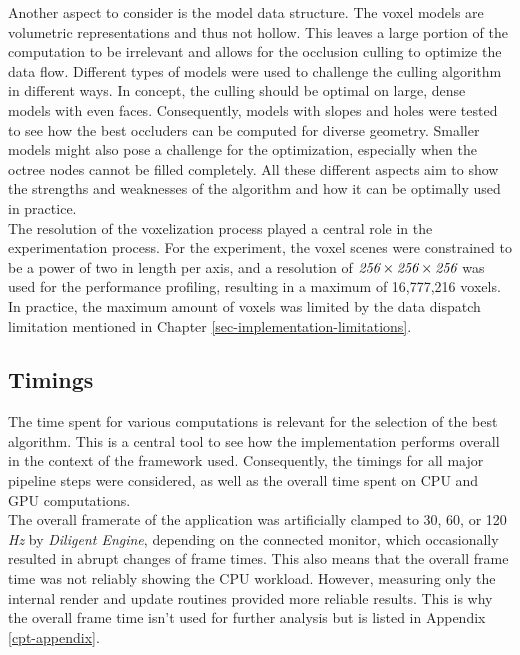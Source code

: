 Another aspect to consider is the model data structure. The voxel models are volumetric representations and thus 
not hollow. This leaves a large portion of the computation to be irrelevant and allows for the occlusion culling to 
optimize the data flow. Different types of models were used to challenge the culling algorithm in different ways. 
In concept, the culling should be optimal on large, dense models with even faces. Consequently, models with 
slopes and holes were tested to see how the best occluders can be computed for diverse geometry. Smaller models might 
also pose a challenge for the optimization, especially when the octree nodes cannot be filled completely. All these 
different aspects aim to show the strengths and weaknesses of the algorithm and how it can be optimally used in practice. \\

\noindent
The resolution of the voxelization process played a central role in the experimentation process.
For the experiment, the voxel scenes were constrained to be a power of two in length per axis, and a resolution 
of $\emph{256} \times \emph{256} \times \emph{256}$ was used for the performance profiling, resulting in a maximum 
of 16,777,216 voxels. In practice, the maximum amount of voxels was limited by the data dispatch limitation mentioned 
in Chapter \ref{sec-implementation-limitations}.


\subsection*{Timings} \label{subsec-timings}

The time spent for various computations is relevant for the selection of the best algorithm. This is a central 
tool to see how the implementation performs overall in the context of the framework used. Consequently, the 
timings for all major pipeline steps were considered, as well as the overall time spent on \ac{CPU} and \ac{GPU} 
computations. \\

\noindent 
The overall framerate of the application was artificially clamped to 30, 60, or 120 \emph{Hz} by \emph{Diligent Engine}, 
depending on the connected monitor, which occasionally resulted in abrupt changes of frame times. This also means 
that the overall frame time was not reliably showing the \ac{CPU} workload. However, measuring only the internal render 
and update routines provided more reliable results. This is why the overall frame time isn't used for further analysis 
but is listed in Appendix \ref{cpt-appendix}.


